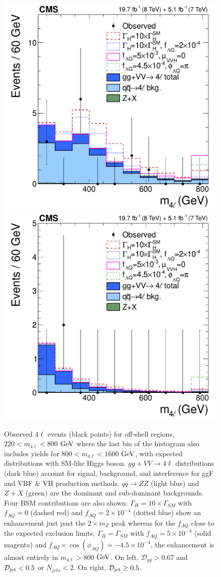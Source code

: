 \begin{figure}[htbp]
\begin{center}
\includegraphics[width=.45\linewidth]{HiggsProperties/figures/nonDjet_m4l_Enhanced_Dgg0p67_new.pdf}
\includegraphics[width=.45\linewidth]{HiggsProperties/figures/Djet_m4l_new.pdf}
\caption[$m_{4\ell}$ Distributions of Jet Categorized Expected and Observed $4\ell$ Events in the Off-Shell Region for $f_{\Lambda Q}$ Measurement]{Observed $4\ell$ events (black points) for off-shell regions, $220<m_{4\ell}<800$ $\rm{GeV}$ where the last bin of the histogram also includes yields for $800<m_{4\ell}<1600$ $\rm{GeV}$, with expected distributions with SM-like Higgs boson. $gg + VV \rightarrow 4\ell$ distributions (dark blue) account for signal, background, and interference for ggF and VBF \& VH production methods. $q\bar{q}\rightarrow ZZ$ (light blue) and $Z+X$ (green) are the dominant and sub-dominant backgrounds. Four BSM contributions are also shown: $\Gamma_H=10\times\Gamma_{SM}$ with $f_{\Lambda Q}=0$ (dashed red) and $f_{\Lambda Q}=2\times10^{-4}$ (dotted blue) show an enhancement just past the $2\times m_{Z}$ peak whereas for the $f_{\Lambda Q}$ close to the expected exclusion limits, $\Gamma_{H}=\Gamma_{SM}$ with $f_{\Lambda Q}=5\times10^{-3}$ (solid magenta) and $f_{\Lambda Q}\times\cos(\phi_{\Lambda Q})=-4.5\times10^{-4}$, the enhancement is almost entirely in $m_{4\ell}>800$ $\rm{GeV}$. On left, $\mathcal{D}_{gg} > 0.67$ and $\mathcal{D}_{\rm jet}<0.5$ or $N_{jets}<2$. On right, $\mathcal{D}_{\rm jet}\geq0.5$.}
\label{fig:OffShell_Categorized}
\end{center}
\end{figure}

